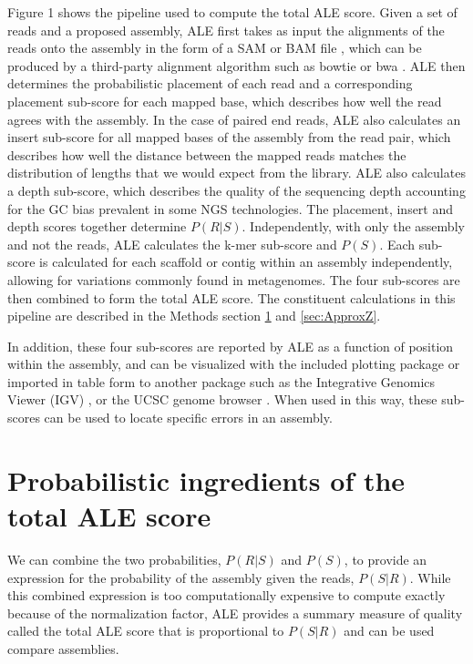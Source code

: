 \documentclass[phd,tocprelim]{cornell}
\begin{document}
Figure 1 shows the pipeline used to compute the total ALE score. Given a set of reads and a proposed assembly, ALE first takes as input the alignments of the reads onto the assembly in the form of a SAM or BAM file \cite{Li2009}, which can be produced by a third-party alignment algorithm such as bowtie \cite{Langmead2009} or bwa \cite{Li2009}. ALE then determines the probabilistic placement of each read and a corresponding placement sub-score for each mapped base, which describes how well the read agrees with the assembly.  In the case of paired end reads, ALE also calculates an insert sub-score for all mapped bases of the assembly from the read pair, which describes how well the distance between the mapped reads matches the distribution of lengths that we would expect from the library.  ALE also calculates a depth sub-score, which describes the quality of the sequencing depth accounting for the GC bias prevalent in some NGS technologies.  The placement, insert and depth scores together determine $P(R|S)$.  Independently, with only the assembly and not the reads, ALE calculates the k-mer sub-score and $P(S)$. Each sub-score is calculated for each scaffold or contig within an assembly independently, allowing for variations commonly found in metagenomes. The four sub-scores are then combined to form the total ALE score. The constituent calculations in this pipeline are described in the Methods section \ref{sec:ingredients_of_ALE_score} and \ref{sec:ApproxZ}.

In addition, these four sub-scores are reported by ALE as a function of position within the assembly, and can be visualized with the included plotting package or imported in table form to another package such as the Integrative Genomics Viewer (IGV) \cite{Nicol2009}, or the UCSC genome browser \cite{Kent2002}.  When used in this way, these sub-scores can be used to locate specific errors in an assembly. 


\section{Probabilistic ingredients of the total ALE score} %
\label{sec:ingredients_of_ALE_score}

We can combine the two probabilities, $P(R|S)$ and $P(S)$, to provide an expression for the probability of the assembly given the reads, $P(S|R)$.  While this combined expression is too computationally expensive to compute exactly because of the normalization factor, ALE provides a summary measure of quality called the total ALE score that is proportional to $P(S|R)$ and can be used compare assemblies.
\end{document}
